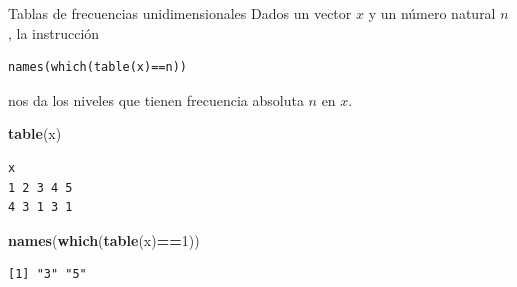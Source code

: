 \documentclass[
  ignorenonframetext,
  aspectratio=169]{beamer}
\newenvironment{Shaded}{\begin{snugshade}}{\end{snugshade}}
\newcommand{\DecValTok}[1]{\textcolor[rgb]{0.00,0.00,0.81}{#1}}
\newcommand{\FunctionTok}[1]{\textcolor[rgb]{0.13,0.29,0.53}{\textbf{#1}}}
\newcommand{\NormalTok}[1]{#1}
\newcommand{\SpecialCharTok}[1]{\textcolor[rgb]{0.81,0.36,0.00}{\textbf{#1}}}
\begin{document}
\begin{frame}[fragile]{Tablas de frecuencias unidimensionales}
\label{tablas-de-frecuencias-unidimensionales-12}
Dados un vector \(x\) y un número natural \(n\), la instrucción

\begin{verbatim}
names(which(table(x)==n))
\end{verbatim}

nos da los niveles que tienen frecuencia absoluta \(n\) en \(x\).

\begin{Shaded}
\begin{Highlighting}[]
\FunctionTok{table}\NormalTok{(x)}
\end{Highlighting}
\end{Shaded}

\begin{verbatim}
x
1 2 3 4 5 
4 3 1 3 1 
\end{verbatim}

\begin{Shaded}
\begin{Highlighting}[]
\FunctionTok{names}\NormalTok{(}\FunctionTok{which}\NormalTok{(}\FunctionTok{table}\NormalTok{(x)}\SpecialCharTok{==}\DecValTok{1}\NormalTok{))}
\end{Highlighting}
\end{Shaded}

\begin{verbatim}
[1] "3" "5"
\end{verbatim}
\end{frame}
\end{document}
